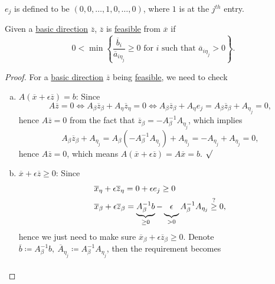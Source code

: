 \begin{notation}
	\(e_j\) is defined to be \((0, 0, \ldots, 1, 0, \ldots , 0 )\), where \(1\) is at the \(j^{th} \) entry.
\end{notation}

\begin{lemma}\label{lma:lec6-1}
	Given a \hyperref[def:basic-direction]{basic direction} \(\overline{z}\), \(\overline{z}\) is \hyperref[def:feasible-direction]{feasible} from \(\overline{x}\) if
	\[
		0< \min\left\{\frac{\overline{b}_i}{\overline{a}_{i \eta_{j}}}\geq 0 \text{ for }i \text{ such that }\overline{a}_{i \eta_{j}}>0\right\}.
	\]
\end{lemma}
\begin{proof}
	For a \hyperref[def:basic-direction]{basic direction} \(\overline{z}\) being \hyperref[def:feasible-direction]{feasible}, we need to check
	\begin{enumerate}[(a)]
		\item \(A(\overline{x} + \epsilon \overline{z}) = b\): Since
		      \[
			      A \overline{z} = 0 \iff A_{\beta}\overline{z}_{\beta} + A_{\eta}\overline{z}_{\eta} = 0 \iff A_{\beta}\overline{z}_{\beta}+A_{\eta}e_{j} = A_{\beta}\overline{z}_{\beta}+A_{\eta_j} = 0,
		      \]
		      hence \(A \overline{z} = 0\) from the fact that \(\overline{z} _\beta = - A_\beta ^{-1} A_{\eta _{j} }\), which implies
		      \[
			      A_\beta \overline{z} _\beta + A_{\eta _{j} } = A_\beta (- A_\beta ^{-1} A_{\eta _{j} }) + A_{\eta _{j} } = -A_{\eta _{j} } + A_{\eta _{j} } = 0,
		      \]
		      hence \(A \overline{z} = 0\), which means \(A(\overline{x} +\epsilon \overline{z} ) = A \overline{x} = b\). \(\surd\)
		\item \(\overline{x} + \epsilon \overline{z} \geq 0\): Since
		      \[
			      \begin{split}
				      &\overline{x}_{\eta} + \epsilon \overline{z}_{\eta} = 0 + \epsilon e_j \geq  0\\
				      &\overline{x}_{\beta}+ \epsilon \overline{z}_{\beta} = \underbrace{A^{-1}_{\beta}b}_{\geq 0} - \underbrace{\vphantom{A^{-1}_{\beta}}\epsilon}_{>0} A^{-1}_{\beta}A_{\eta_j}\overset{?}{\geq} 0,
			      \end{split}
		      \]
		      hence we just need to make sure \(\overline{x} _\beta + \epsilon \overline{z} _\beta \geq 0\). Denote \(\overline{b} \coloneqq A^{-1}_{\beta} b,\ \overline{A}_{\eta_j} \coloneqq A^{-1}_{\beta}A_{\eta_j}\), then the requirement becomes
		      \[
			      \begin{aligned}

\end{aligned}\]
\end{enumerate}
\end{proof}
